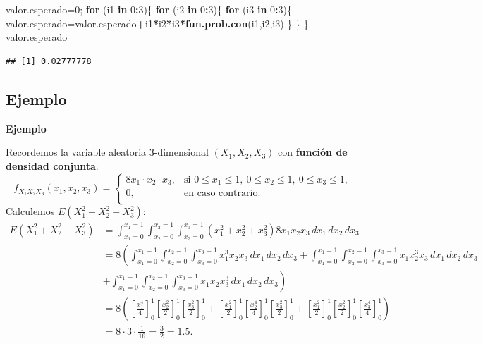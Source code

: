 \documentclass[]{book}
\newenvironment{Shaded}{\begin{snugshade}}{\end{snugshade}}
\newcommand{\ControlFlowTok}[1]{\textcolor[rgb]{0.13,0.29,0.53}{\textbf{#1}}}
\newcommand{\DecValTok}[1]{\textcolor[rgb]{0.00,0.00,0.81}{#1}}
\newcommand{\KeywordTok}[1]{\textcolor[rgb]{0.13,0.29,0.53}{\textbf{#1}}}
\newcommand{\NormalTok}[1]{#1}
\newcommand{\OperatorTok}[1]{\textcolor[rgb]{0.81,0.36,0.00}{\textbf{#1}}}
\begin{document}
\begin{Shaded}
\begin{Highlighting}[]
\NormalTok{valor.esperado=}\DecValTok{0}\NormalTok{;}
\ControlFlowTok{for}\NormalTok{ (i1 }\ControlFlowTok{in} \DecValTok{0}\OperatorTok{:}\DecValTok{3}\NormalTok{)\{}
  \ControlFlowTok{for}\NormalTok{ (i2 }\ControlFlowTok{in} \DecValTok{0}\OperatorTok{:}\DecValTok{3}\NormalTok{)\{}
    \ControlFlowTok{for}\NormalTok{ (i3 }\ControlFlowTok{in} \DecValTok{0}\OperatorTok{:}\DecValTok{3}\NormalTok{)\{}
\NormalTok{      valor.esperado=valor.esperado}\OperatorTok{+}\NormalTok{i1}\OperatorTok{*}\NormalTok{i2}\OperatorTok{*}\NormalTok{i3}\OperatorTok{*}\KeywordTok{fun.prob.con}\NormalTok{(i1,i2,i3)}
\NormalTok{    \}}
\NormalTok{  \}}
\NormalTok{\}}
\NormalTok{valor.esperado}
\end{Highlighting}
\end{Shaded}

\begin{verbatim}
## [1] 0.02777778
\end{verbatim}

\hypertarget{ejemplo-128}{%
\subsection{Ejemplo}\label{ejemplo-128}}

\textbf{Ejemplo}

Recordemos la variable aleatoria \(3\)-dimensional \((X_1,X_2,X_3)\) con \textbf{función de densidad conjunta}:
\[
f_{X_1X_2X_3}(x_1,x_2,x_3)=\begin{cases}
8 x_1\cdot x_2\cdot x_3, & \mbox{si }0\leq x_1\leq 1,\ 0\leq x_2\leq 1,\ 0\leq x_3\leq 1, \\
0, & \mbox{en caso contrario.}\\
\end{cases}
\]
Calculemos \(E(X_1^2+X_2^2+X_3^2)\):
\[
\begin{array}{rl}
E(X_1^2+X_2^2+X_3^2) & =\int_{x_1=0}^{x_1=1} \int_{x_2=0}^{x_2=1}\int_{x_3=0}^{x_3=1} (x_1^2+x_2^2+x_3^2) 8 x_1 x_2 x_3 \,dx_1\, dx_2\, dx_3\\ & =8\left(\int_{x_1=0}^{x_1=1} \int_{x_2=0}^{x_2=1}\int_{x_3=0}^{x_3=1}   x_1^3 x_2 x_3 \,dx_1\, dx_2\, dx_3 + \int_{x_1=0}^{x_1=1} \int_{x_2=0}^{x_2=1}\int_{x_3=0}^{x_3=1}   x_1 x_2^3 x_3 \,dx_1\, dx_2\, dx_3 \right.\\ & \left. + \int_{x_1=0}^{x_1=1} \int_{x_2=0}^{x_2=1}\int_{x_3=0}^{x_3=1}   x_1 x_2 x_3^3 \,dx_1\, dx_2\, dx_3\right) \\ & =
8\left(\left[\frac{x_1^4}{4}\right]_0^1 \left[\frac{x_2^2}{2}\right]_0^1 \left[\frac{x_3^2}{2}\right]_0^1 + \left[\frac{x_1^2}{2}\right]_0^1 \left[\frac{x_2^4}{4}\right]_0^1 \left[\frac{x_3^2}{2}\right]_0^1 + \left[\frac{x_1^2}{2}\right]_0^1 \left[\frac{x_2^2}{2}\right]_0^1 \left[\frac{x_3^4}{4}\right]_0^1\right) \\ & =8\cdot 3\cdot \frac{1}{16}=\frac{3}{2}=1.5.
\end{array}
\]
\end{document}
